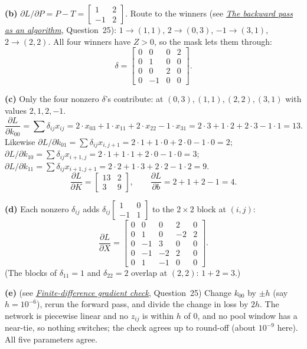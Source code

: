 \documentclass[12pt,a4paper]{article}
\newcommand{\seeconcept}[3]{(see \hyperref[#1]{\textit{#2}}, Question~#3)}
\begin{document}
\textbf{(b)} $\partial L/\partial P=P-T=\begin{bmatrix}1&2\\-1&2\end{bmatrix}$. Route to the winners \seeconcept{c:cnnbackalg}{The backward pass as an algorithm}{25}: $1\to(1,1)$, $2\to(0,3)$, $-1\to(3,1)$, $2\to(2,2)$. All four winners have $Z>0$, so the mask lets them through:
\[
\delta=\begin{bmatrix}0&0&0&2\\0&1&0&0\\0&0&2&0\\0&-1&0&0\end{bmatrix}.
\]

\textbf{(c)} Only the four nonzero $\delta$'s contribute: at $(0,3),(1,1),(2,2),(3,1)$ with values $2,1,2,-1$.
\[
\frac{\partial L}{\partial k_{00}}=\sum\delta_{ij}x_{ij}=2\cdot x_{03}+1\cdot x_{11}+2\cdot x_{22}-1\cdot x_{31}=2\cdot3+1\cdot2+2\cdot3-1\cdot1=13 .
\]
Likewise $\partial L/\partial k_{01}=\sum\delta_{ij}x_{i,j+1}=2\cdot1+1\cdot0+2\cdot0-1\cdot0=2$; $\partial L/\partial k_{10}=\sum\delta_{ij}x_{i+1,j}=2\cdot1+1\cdot1+2\cdot0-1\cdot0=3$; $\partial L/\partial k_{11}=\sum\delta_{ij}x_{i+1,j+1}=2\cdot2+1\cdot3+2\cdot2-1\cdot2=9$.
\[
\frac{\partial L}{\partial K}=\begin{bmatrix}13&2\\3&9\end{bmatrix},\qquad \frac{\partial L}{\partial b}=2+1+2-1=4 .
\]

\textbf{(d)} Each nonzero $\delta_{ij}$ adds $\delta_{ij}\begin{bmatrix}1&0\\-1&1\end{bmatrix}$ to the $2\times2$ block at $(i,j)$:
\[
\frac{\partial L}{\partial X}=\begin{bmatrix}0&0&0&2&0\\0&1&0&-2&2\\0&-1&3&0&0\\0&-1&-2&2&0\\0&1&-1&0&0\end{bmatrix}.
\]
(The blocks of $\delta_{11}=1$ and $\delta_{22}=2$ overlap at $(2,2)$: $1+2=3$.)

\textbf{(e)} \seeconcept{c:fdcheck}{Finite-difference gradient check}{25} Change $k_{00}$ by $\pm h$ (say $h=10^{-6}$), rerun the forward pass, and divide the change in loss by $2h$. The network is piecewise linear and no $z_{ij}$ is within $h$ of 0, and no pool window has a near-tie, so nothing switches; the check agrees up to round-off (about $10^{-9}$ here). All five parameters agree.
\end{document}
